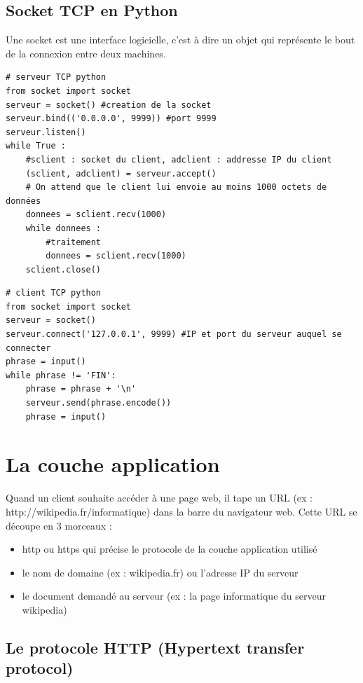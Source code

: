 \subsection{Socket TCP en Python}

\begin{definition}
	Une socket est une interface logicielle, c'est à dire un objet qui représente le bout de la connexion entre deux machines.
\end{definition}

\begin{algo}
	\begin{lstlisting}[style=PythonStyle]
# serveur TCP python
from socket import socket 
serveur = socket() #creation de la socket
serveur.bind(('0.0.0.0', 9999)) #port 9999
serveur.listen()
while True :
    #sclient : socket du client, adclient : addresse IP du client
    (sclient, adclient) = serveur.accept()
    # On attend que le client lui envoie au moins 1000 octets de données
    donnees = sclient.recv(1000)
    while donnees : 
        #traitement
        donnees = sclient.recv(1000)
    sclient.close()
	\end{lstlisting}
	\begin{lstlisting}[style=PythonStyle]
# client TCP python
from socket import socket
serveur = socket()
serveur.connect('127.0.0.1', 9999) #IP et port du serveur auquel se connecter
phrase = input()
while phrase != 'FIN':
	phrase = phrase + '\n'
	serveur.send(phrase.encode())
	phrase = input()
	\end{lstlisting}
\end{algo}

\section{La couche application}

Quand un client souhaite accéder à une page web, il tape un URL (ex : http://wikipedia.fr/informatique) dans la barre du navigateur web. Cette URL se découpe en 3 morceaux : \begin{itemize}
	\item http ou https qui précise le protocole de la couche application utilisé
	\item le nom de domaine (ex : wikipedia.fr) ou l'adresse IP du serveur
	\item le document demandé au serveur (ex : la page informatique du serveur wikipedia) 
\end{itemize}

\subsection{Le protocole HTTP (Hypertext transfer protocol)}

